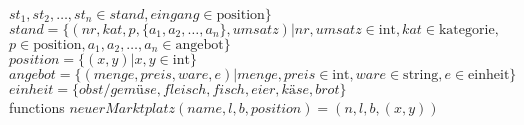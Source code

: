 \documentclass[12pt, twoside]{article}
\begin{document}
\begin{tabbing}
\> \> $st_1, st_2, \dots,st_n \in stand, eingang \in \text{position}\}$ \\
            \> $stand = \{(nr, kat, p, \{a_1, a_2,\dots, a_n\}, umsatz) | nr, umsatz \in \text{int}, kat\in \text{kategorie},$ \\
            \>  \>$ p\in \text{position}, a_1, a_2,\dots, a_n\in \text{angebot}\}$\\
            \> $position = \{(x, y) | x, y \in \text{int}\}$ \\
            \> $angebot = \{(menge, preis, ware, e) | menge, preis \in \text{int}, ware \in \text{string}, e \in \text{einheit} \}$ \\
            \> $einheit = \{obst/gemüse, fleisch, fisch, eier, käse, brot\}$ \\
 
     
functions   \> $neuerMarktplatz(name, l, b, position) = (n, l, b, (x, y))$                 \\

\end{tabbing}
\end{document}

